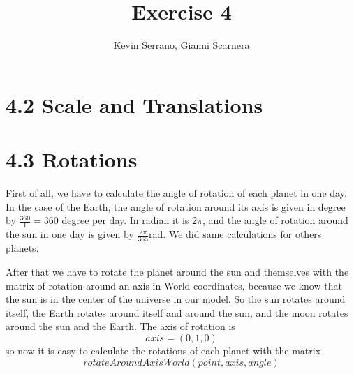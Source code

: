 \documentclass[10pt,a4paper]{report}
\author{Kevin Serrano, Gianni Scarnera}
\title{Exercise 4}
\begin{document}
\maketitle

\section*{4.2   Scale and Translations}

\section*{4.3   Rotations}
First of all, we have to calculate the angle of rotation of each planet in one day. In the case of the Earth, the angle of rotation around its axis is given in degree by $\frac{360}{1} = 360$ degree per day. In radian it is $2 \pi$, and the angle of rotation around the sun in one day is given by $\frac{2 \pi}{365} $rad. We did same calculations for others planets.

After that we have to rotate the planet around the sun and themselves with the matrix of rotation around an axis in World coordinates, because we know that the sun is in the center of the universe in our model. So the sun rotates around itself, the Earth rotates around itself and around the sun, and the moon rotates around the sun and the Earth. The axis of rotation is $$axis = (0,1,0)$$ so now it is easy to calculate the rotations of each planet with the matrix $$rotateAroundAxisWorld(point,axis,angle)$$
\end{document}
